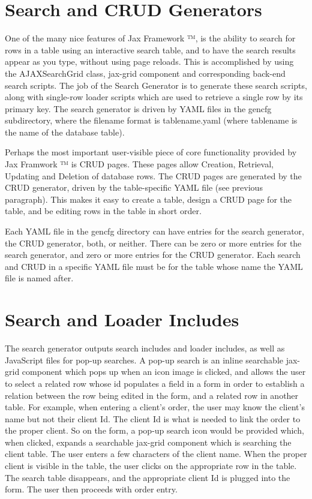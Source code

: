 \documentclass[letterpaper,10pt,english]{sphinxmanual}
\begin{document}
\section{Search and CRUD Generators}
\label{jaxFrameworkGuide:search-and-crud-generators}
One of the many nice features of Jax Framework ™, is the ability to search for rows in a table
using an interactive search table, and to have the search results appear as you type, without using
page reloads.  This is accomplished by using the AJAXSearchGrid class, jax-grid component and
corresponding back-end search scripts.  The job of the Search Generator is to generate these search
scripts, along with single-row loader scripts which are used to retrieve a single row by its primary
key.  The search generator is driven by YAML files in the gencfg subdirectory, where the filename
format is tablename.yaml (where tablename is the name of the database table).

Perhaps the most important user-visible piece of core functionality provided by Jax Framwork ™
is CRUD pages.  These pages allow Creation, Retrieval, Updating and Deletion of database rows.  The
CRUD pages are generated by the CRUD generator, driven by the table-specific YAML file (see previous
paragraph).  This makes it easy to create a table, design a CRUD page for the table, and be editing
rows in the table in short order.

Each YAML file in the gencfg directory can have entries for the search generator, the CRUD
generator, both, or neither.  There can be zero or more entries for the search generator, and zero
or more entries for the CRUD generator.  Each search and CRUD in a specific YAML file must be for
the table whose name the YAML file is named after.


\section{Search and Loader Includes}
\label{jaxFrameworkGuide:search-and-loader-includes}
The search generator outputs search includes and loader includes, as well as JavaScript files for
pop-up searches.  A pop-up search is an inline searchable jax-grid component which pops up when an
icon image is clicked, and allows the user to select a related row whose id populates a field in a
form in order to establish a relation between the row being edited in the form, and a related row in
another table.  For example, when entering a client's order, the user may know the client's name but
not their client Id.  The client Id is what is needed to link the order to the proper client. So on
the form, a pop-up search icon would be provided which, when clicked, expands a searchable
jax-grid component which is searching the client table.  The user enters a few characters of the
client name. When the proper client is visible in the table, the user clicks on the appropriate row
in the table.  The search table disappears, and the appropriate client Id is plugged into the form.
The user then proceeds with order entry.
\end{document}
